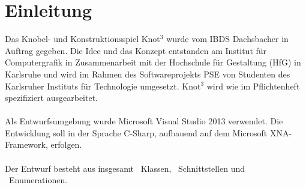 \chapter{Einleitung}


Das Knobel- und Konstruktionsspiel Knot$^3$ wurde vom IBDS Dachsbacher in Auftrag gegeben. Die Idee und das Konzept entstanden am Institut für Computergrafik in Zusammenarbeit mit der Hochschule für Gestaltung (HfG) in Karlsruhe und wird im Rahmen des Softwareprojekts PSE von Studenten des Karlsruher Instituts für Technologie umgesetzt. Knot$^3$ wird wie im Pflichtenheft spezifiziert ausgearbeitet.
\\\\
Als Entwurfsumgebung wurde Microsoft Visual Studio 2013 verwendet. Die Entwicklung soll in der Sprache C-Sharp, aufbauend auf dem Microsoft XNA-Framework, erfolgen.
\\\\
Der Entwurf besteht aus insgesamt \CountClasses~Klassen, \CountInterfaces~Schnittstellen und \CountEnums~Enumerationen.